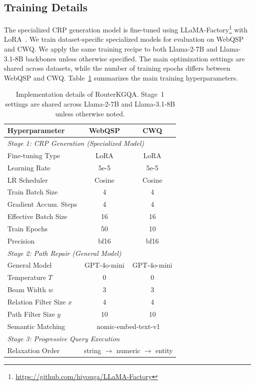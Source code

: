 \documentclass[11pt]{article}
\begin{document}
\subsection{Training Details}

The specialized CRP generation model is fine-tuned using LLaMA-Factory\footnote{\url{https://github.com/hiyouga/LLaMA-Factory}} with LoRA~\citep{hu2022lora}. We train dataset-specific specialized models for evaluation on WebQSP and CWQ. We apply the same training recipe to both Llama-2-7B and Llama-3.1-8B backbones unless otherwise specified. The main optimization settings are shared across datasets, while the number of training epochs differs between WebQSP and CWQ. Table~\ref{tab:hyperparams} summarizes the main training hyperparameters.

\begin{table}[h]
\centering
\small
\setlength{\tabcolsep}{4pt}
\begin{tabular}{lcc}
\toprule
\textbf{Hyperparameter} & \textbf{WebQSP} & \textbf{CWQ} \\
\midrule
\multicolumn{3}{l}{\emph{Stage 1: CRP Generation (Specialized Model)}} \\
Fine-tuning Type & LoRA & LoRA \\
Learning Rate & 5e-5 & 5e-5 \\
LR Scheduler & Cosine & Cosine \\
Train Batch Size & 4 & 4 \\
Gradient Accum. Steps & 4 & 4 \\
Effective Batch Size & 16 & 16 \\
Train Epochs & 50 & 10 \\
Precision & bf16 & bf16 \\
\midrule
\multicolumn{3}{l}{\emph{Stage 2: Path Repair (General Model)}} \\
General Model & GPT-4o-mini & GPT-4o-mini \\
Temperature $T$ & 0 & 0 \\
Beam Width $w$ & 3 & 3 \\
Relation Filter Size $x$ & 4 & 4 \\
Path Filter Size $y$ & 10 & 10 \\
Semantic Matching & \multicolumn{2}{c}{nomic-embed-text-v1} \\
\midrule
\multicolumn{3}{l}{\emph{Stage 3: Progressive Query Execution}} \\
Relaxation Order & \multicolumn{2}{c}{string $\to$ numeric $\to$ entity} \\
\bottomrule
\end{tabular}
\caption{Implementation details of RouterKGQA. Stage~1 settings are shared across Llama-2-7B and Llama-3.1-8B unless otherwise noted.}
\label{tab:hyperparams}
\end{table}
\end{document}
